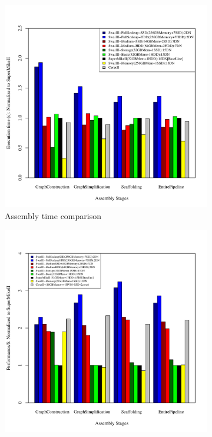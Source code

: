 \documentclass[conference]{IEEEtran}
\begin{document}
\begin{figure}[htb]
        \begin{subfigure}[b]{0.5\textwidth}
                \includegraphics[width=\textwidth]{Figure/PerormanceData/Plots/DifferentArchitectures.pdf}
                \caption{Assembly time comparison}
                \label{fig:DifferentArchitecturesPerf}
        \end{subfigure}
        \begin{subfigure}[b]{0.5\textwidth}
                \includegraphics[width=\textwidth]{Figure/PerormanceData/Plots/PerfPerDollar.pdf}

\end{subfigure}
\end{figure}
\end{document}
